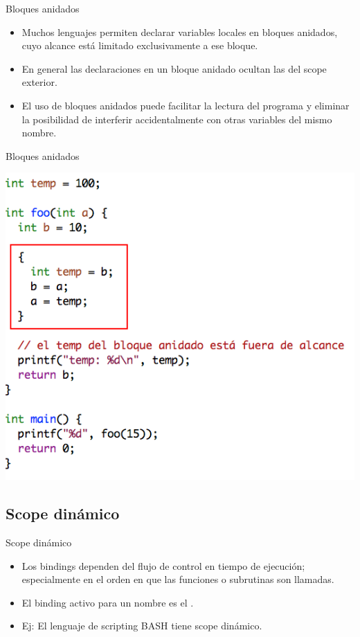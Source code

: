 \documentclass{beamer} %
\newcommand{\redb}[1]{{\color{red!70!black}{#1}}}
\begin{document}
\begin{frame}{Bloques anidados}
    \begin{itemize}
        \item Muchos lenguajes permiten declarar variables locales en bloques anidados, cuyo alcance está limitado exclusivamente a ese bloque.
        \item En general las declaraciones en un bloque anidado ocultan las del scope exterior.
        \item El uso de bloques anidados puede facilitar la lectura del programa y eliminar la posibilidad de interferir accidentalmente con otras variables del mismo nombre.
    \end{itemize}
\end{frame}

\begin{frame}{Bloques anidados}
    \begin{center}
        \includegraphics[width=.8\textwidth]{./image/cap5/scope-bloques-anidados}
    \end{center}
\end{frame}

\subsection{Scope dinámico}

\begin{frame}{Scope dinámico}
    \begin{itemize}
        \item<1-> Los bindings dependen del flujo de control en tiempo de ejecución; especialmente en el orden en que las funciones o subrutinas son llamadas.
        \item<2-> El binding activo para un nombre es el \redb{más reciente durante la ejecución}.
        \item<3-> Ej: El lenguaje de scripting BASH tiene scope dinámico.
    \end{itemize}
\end{frame}
\end{document}
